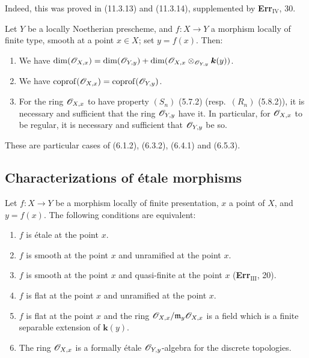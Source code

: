 Indeed, this was proved in (11.3.13) and (11.3.14), supplemented by \textbf{Err}$_{\mathrm{IV}}$, 30.

\begin{proposition}[17.5.8]
\label{IV.17.5.8}
Let $Y$ be a locally Noetherian prescheme, and $f:X\to Y$ a morphism locally of finite type, smooth at a point $x\in X$; set $y=f(x)$. Then:
\begin{enumerate}
  \item[\textup{(i)}] We have $\dim(\mathscr{O}_{X,x})=\dim(\mathscr{O}_{Y,y})+\dim(\mathscr{O}_{X,x}\otimes_{\mathscr{O}_{Y,y}}\boldsymbol{k}(y))$.
  \item[\textup{(ii)}] We have $\operatorname{coprof}(\mathscr{O}_{X,x})=\operatorname{coprof}(\mathscr{O}_{Y,y})$.
  \item[\textup{(iii)}] For the ring $\mathscr{O}_{X,x}$ to have property $(S_n)$ \textup{(5.7.2) (resp.}\ $(R_n)$ \textup{(5.8.2))}, it is necessary and sufficient that the ring $\mathscr{O}_{Y,y}$ have it. In particular, for $\mathscr{O}_{X,x}$ to be regular, it is necessary and sufficient that $\mathscr{O}_{Y,y}$ be so.
\end{enumerate}
\end{proposition}

These are particular cases of (6.1.2), (6.3.2), (6.4.1) and (6.5.3).

\subsection{Characterizations of étale morphisms}

\begin{theorem}[17.6.1]
\label{IV.17.6.1}
Let $f:X\to Y$ be a morphism locally of finite presentation, $x$ a point of $X$, and $y=f(x)$. The following conditions are equivalent:
\begin{enumerate}
  \item[\textup{a)}] $f$ is étale at the point $x$.
  \item[\textup{a$'$)}] $f$ is smooth at the point $x$ and unramified at the point $x$.
  \item[\textup{b)}] $f$ is smooth at the point $x$ and quasi-finite at the point $x$ \textup{(\textbf{Err}$_{\mathrm{III}}$, 20)}.
  \item[\textup{c)}] $f$ is flat at the point $x$ and unramified at the point $x$.
  \item[\textup{c$'$)}] $f$ is flat at the point $x$ and the ring $\mathscr{O}_{X,x}/\mathfrak m_y\mathscr{O}_{X,x}$ is a field which is a finite separable extension of $\boldsymbol{k}(y)$.
  \item[\textup{d)}] The ring $\mathscr{O}_{X,x}$ is a formally étale $\mathscr{O}_{Y,y}$-algebra for the discrete topologies.
\end{enumerate}
\end{theorem}

